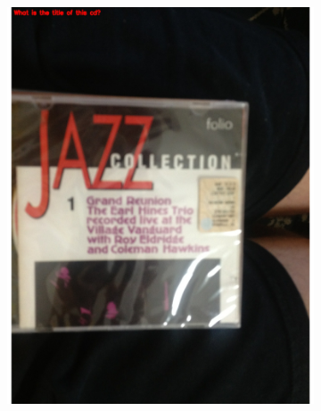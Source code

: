 \documentclass[sigconf]{acmart}
\begin{document}
\begin{figure}[hbp]
\begin{subfigure}[b]{0.3\columnwidth}
                \includegraphics[width=\textwidth]{images/reading_2.pdf}  
        \end{subfigure}%
        \begin{subfigure}[b]{0.3\columnwidth}

\end{subfigure}
\end{figure}
\end{document}
